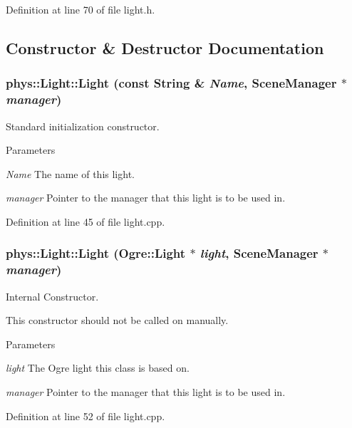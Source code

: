 Definition at line 70 of file light.h.



\subsection{Constructor \& Destructor Documentation}
\hypertarget{classphys_1_1Light_a4bcb13aaf1ab92e7df71b565eeec61e4}{
\subsubsection[{Light}]{\setlength{\rightskip}{0pt plus 5cm}phys::Light::Light (const {\bf String} \& {\em Name}, \/  {\bf SceneManager} $\ast$ {\em manager})}}
\label{dc/df1/classphys_1_1Light_a4bcb13aaf1ab92e7df71b565eeec61e4}


Standard initialization constructor. 


\begin{DoxyParams}{Parameters}
\item[{\em Name}]The name of this light. \item[{\em manager}]Pointer to the manager that this light is to be used in. \end{DoxyParams}


Definition at line 45 of file light.cpp.

\hypertarget{classphys_1_1Light_a27cfdf1933c6b0054aa4ef8348f56daa}{
\subsubsection[{Light}]{\setlength{\rightskip}{0pt plus 5cm}phys::Light::Light (Ogre::Light $\ast$ {\em light}, \/  {\bf SceneManager} $\ast$ {\em manager})}}
\label{dc/df1/classphys_1_1Light_a27cfdf1933c6b0054aa4ef8348f56daa}


Internal Constructor. 

This constructor should not be called on manually. 
\begin{DoxyParams}{Parameters}
\item[{\em light}]The Ogre light this class is based on. \item[{\em manager}]Pointer to the manager that this light is to be used in. \end{DoxyParams}


Definition at line 52 of file light.cpp.



